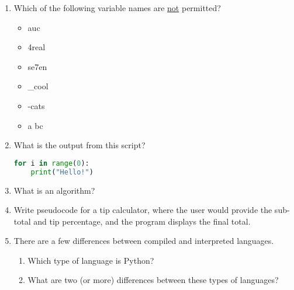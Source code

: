 \documentclass[letter,10pt]{article}
\begin{document}
\begin{enumerate}
    \item Which of the following variable names are \underline{not} permitted?
    \begin{itemize}
        \item auc
        \item 4real
        \item se7en
        \item \_cool
        \item -cats
        \item a bc
    \end{itemize}

    \item What is the output from this script?
    \begin{lstlisting}[language=python]
for i in range(0):
    print("Hello!")
    \end{lstlisting}
    
    \item What is an algorithm?
    
    \item Write pseudocode for a tip calculator, where the user would provide the sub-total and tip percentage, and the program displays the final total.
    
    \item There are a few differences between compiled and interpreted languages.
    \begin{enumerate}
    	\item Which type of language is Python?
		\item What are two (or more) differences between these types of languages?
    \end{enumerate}
\end{enumerate}
\end{document}
